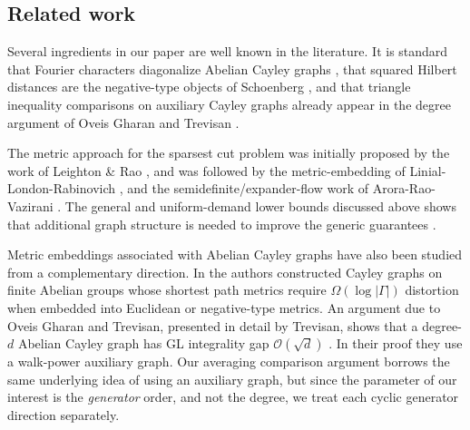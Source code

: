 \documentclass[11pt]{article}
\theoremstyle{definition}
\theoremstyle{remark}
\begin{document}
\subsection{Related work}
\label{subsect:relatedwork}
Several ingredients in our paper are well known in the literature. It is standard that Fourier characters diagonalize Abelian Cayley graphs \cite{SteinbergGroups, kantor2015mathematics, Trevisan21}, that squared Hilbert distances are the negative-type objects of Schoenberg \cite{Schoenberg38}, and that triangle inequality comparisons on auxiliary Cayley graphs already appear in the degree argument of Oveis Gharan and Trevisan \cite{Trevisan21}. 


The metric approach for the sparsest cut problem was initially proposed by the work of Leighton \& Rao \cite{LR99}, and was followed by the metric-embedding of Linial-London-Rabinovich \cite{LLR95}, and the semidefinite/expander-flow work of Arora-Rao-Vazirani \cite{ARV09}. 
The general and uniform-demand lower bounds discussed above shows that additional graph structure is needed to improve the generic guarantees \cite{KM13,NY17,CNR25}. 

Metric embeddings associated with Abelian Cayley graphs have also been studied from a complementary direction. In  \cite{DBLP:journals/toc/NewmanR09} the authors constructed Cayley graphs on finite Abelian groups whose shortest path metrics require $\Omega (\log |\Gamma|)$ distortion when embedded into Euclidean or negative-type metrics. 
An argument due to Oveis Gharan and Trevisan, presented in detail by Trevisan, shows that a degree-$d$ Abelian Cayley graph has GL integrality gap $\mathcal O(\sqrt d)$ \cite{Trevisan21}. In their proof they use a walk-power auxiliary graph. Our averaging comparison argument borrows the same underlying idea of using an auxiliary graph, but since the parameter of our interest is the \emph{generator} order, and not the degree, we treat each cyclic generator direction separately.


\end{document}
